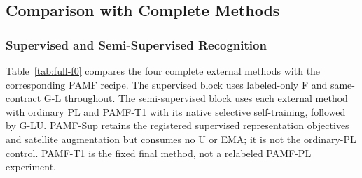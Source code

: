 \subsection{Comparison with Complete Methods}

\subsubsection{Supervised and Semi-Supervised Recognition}

Table~\ref{tab:full-f0} compares the four complete external methods with the corresponding PAMF recipe. The supervised block uses labeled-only F and same-contract G-L throughout. The semi-supervised block uses each external method with ordinary PL and PAMF-T1 with its native selective self-training, followed by G-LU. PAMF-Sup retains the registered supervised representation objectives and satellite augmentation but consumes no U or EMA; it is not the ordinary-PL control. PAMF-T1 is the fixed final method, not a relabeled PAMF-PL experiment.

